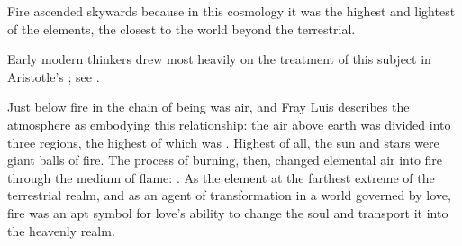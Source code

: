 Fire ascended skywards because in this cosmology it was the highest and
lightest of the elements, the closest to the world beyond the terrestrial.%
\begin{Footnote}
    Early modern thinkers drew most heavily on the treatment of this subject in
    Aristotle's ; see \autocite{Lang:AristotleMedieval}.
\end{Footnote}
Just below fire in the chain of being was air, and Fray Luis describes the
atmosphere as embodying this relationship: the air above earth was divided into
three regions, the highest of which was .%
    \Autocite[207]{LuisdeGranada:Simbolo}
Highest of all, the sun and stars were giant balls of fire.
The process of burning, then, changed elemental air into fire through the
medium of flame: .%
    \Autocite[205]{LuisdeGranada:Simbolo}
As the element at the farthest extreme of the terrestrial realm, and as an
agent of transformation in a world governed by love, fire was an apt symbol for
love's ability to change the soul and transport it into the heavenly realm.

